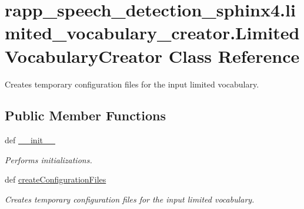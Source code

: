 \hypertarget{classrapp__speech__detection__sphinx4_1_1limited__vocabulary__creator_1_1LimitedVocabularyCreator}{\section{rapp\-\_\-speech\-\_\-detection\-\_\-sphinx4.\-limited\-\_\-vocabulary\-\_\-creator.\-Limited\-Vocabulary\-Creator Class Reference}
\label{classrapp__speech__detection__sphinx4_1_1limited__vocabulary__creator_1_1LimitedVocabularyCreator}
}


Creates temporary configuration files for the input limited vocabulary.  


\subsection*{Public Member Functions}
\begin{DoxyCompactItemize}
\item 
def \hyperlink{classrapp__speech__detection__sphinx4_1_1limited__vocabulary__creator_1_1LimitedVocabularyCreator_a26ef90561284a9d51a29894801fbdbd8}{\-\_\-\-\_\-init\-\_\-\-\_\-}
\begin{DoxyCompactList}\small\item\em Performs initializations. \end{DoxyCompactList}\item 
def \hyperlink{classrapp__speech__detection__sphinx4_1_1limited__vocabulary__creator_1_1LimitedVocabularyCreator_a5ea9589816e726aca357489c2e7a1d19}{create\-Configuration\-Files}
\begin{DoxyCompactList}\small\item\em Creates temporary configuration files for the input limited vocabulary. \end{DoxyCompactList}\end{DoxyCompactItemize}
